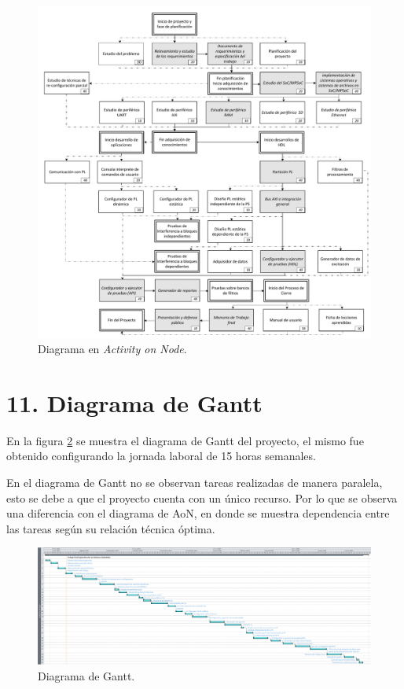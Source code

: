\documentclass[
11pt, %
]{charter}
\begin{document}
\begin{figure}[hb]
\centering 
\includegraphics[width=1.03\textwidth]{./Figuras/AoN.pdf}
\caption{Diagrama en \textit{Activity on Node}.}
\label{fig:AoN}
\end{figure}

\section{11. Diagrama de Gantt}
\label{sec:gantt}

En la figura \ref{fig:diagGantt} se muestra el diagrama de Gantt del proyecto, el mismo fue obtenido configurando la jornada laboral de 15 horas semanales.

En el diagrama de Gantt no se observan tareas realizadas de manera paralela,  esto se debe a que el proyecto cuenta con un único recurso. Por lo que se observa una diferencia con el diagrama de AoN, en donde se muestra dependencia entre las tareas según su relación técnica óptima.


\begin{figure}[h]
\centering 
\includegraphics[angle=90, height=0.98\textheight]{./Figuras/Gantt-real.png}
\caption{Diagrama de Gantt.}
\label{fig:diagGantt}
\end{figure}
\end{document}
